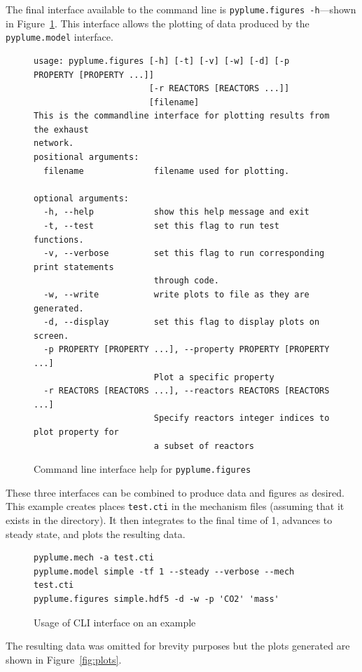 \documentclass[smallextended,referee]{svjour3}
\newenvironment{codeblock}[1]
{
\begin{figure}[hbt]
\newcommand{\captionMacro}{#1}
\centering
\begin{tcolorbox}[width=15cm]
}
{
\end{tcolorbox}
\caption{\captionMacro{}}
\end{figure}
}
\begin{document}
The final interface available to the command line is \texttt{pyplume.figures -h}---shown in Figure~\ref{code:figures}. This interface allows the plotting of data produced by the \texttt{pyplume.model} interface.

\begin{codeblock}{Command line interface help for \texttt{pyplume.figures}}
\begin{lstlisting}
usage: pyplume.figures [-h] [-t] [-v] [-w] [-d] [-p PROPERTY [PROPERTY ...]]
                       [-r REACTORS [REACTORS ...]]
                       [filename]
This is the commandline interface for plotting results from the exhaust
network.
positional arguments:
  filename              filename used for plotting.

optional arguments:
  -h, --help            show this help message and exit
  -t, --test            set this flag to run test functions.
  -v, --verbose         set this flag to run corresponding print statements
                        through code.
  -w, --write           write plots to file as they are generated.
  -d, --display         set this flag to display plots on screen.
  -p PROPERTY [PROPERTY ...], --property PROPERTY [PROPERTY ...]
                        Plot a specific property
  -r REACTORS [REACTORS ...], --reactors REACTORS [REACTORS ...]
                        Specify reactors integer indices to plot property for
                        a subset of reactors

\end{lstlisting}
\label{code:figures}
\end{codeblock}

These three interfaces can be combined to produce data and figures as desired. This example creates places \texttt{test.cti} in the mechanism files (assuming that it exists in the directory). It then integrates to the final time of 1, advances to steady state, and plots the resulting data.

\begin{codeblock}{Usage of CLI interface on an example}
\begin{lstlisting}
pyplume.mech -a test.cti
pyplume.model simple -tf 1 --steady --verbose --mech test.cti
pyplume.figures simple.hdf5 -d -w -p 'CO2' 'mass'
\end{lstlisting}
\label{code:CLI}
\end{codeblock}

The resulting data was omitted for brevity purposes but the plots generated are shown in Figure~\ref{fig:plots}.
\end{document}
